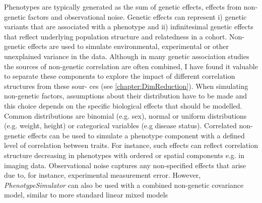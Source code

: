 
Phenotypes are typically generated as the sum of genetic effects, effects from non-genetic factors and observational noise. Genetic effects can represent i) genetic variants that are associated with a phenotype and ii) infinitesimal genetic effects that reflect underlying population structure and relatedness in a cohort. Non-genetic effects are used to simulate environmental, experimental or other unexplained variance in the data. 
Although in many genetic association studies the sources of non-genetic correlation are often combined, I have found it valuable to separate these components to explore the impact of different correlation structures from these sour- ces (see \cref{chapter:DimReduction}).
When simulating non-genetic factors, assumptions about their distribution have to be made and this choice depends on the specific biological effects that should be modelled. Common distributions are binomial (e.g. sex), normal or uniform distributions (e.g. weight, height) or categorical variables (e.g disease status).  Correlated non-genetic effects can be used to simulate a phenotype component with a defined level of correlation between traits. For instance, such effects can reflect correlation structure decreasing in phenotypes with ordered or spatial components e.g. in imaging data. Observational noise captures any non-specified effects that arise due to, for instance, experimental measurement error. However, \textit{PhenotypeSimulator} can also be used with a combined non-genetic covariance model, similar to more standard linear mixed models \citep{OReilly2012,Zhou2014,Porter2017}

